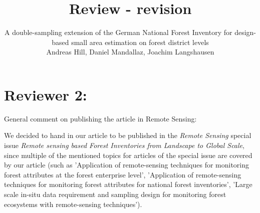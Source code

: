 \documentclass{article}
\title{Review - revision}
\author{A double-sampling extension of the German National Forest Inventory for design-based small area estimation on forest district levels\\
Andreas Hill, Daniel Mandallaz, Joachim Langshausen}
\begin{document}

\maketitle
\thispagestyle{empty}
\newpage

\setcounter{page}{1}

\pagestyle{fancy} %
\fancyfoot[C]{\thepage}
\setlength{\headsep}{15mm}

\newcommand{\answer}[1]{\small \color{mybrown}{#1} \color{black}}
\newcommand{\note}[1]{\textit{\small \color{amaranth} \textbf{Note:} #1} \color{black}}
\newcommand{\todo}[1]{\color{red}{#1} \color{black}}
\newcommand{\answerfin}[1]{\small \color{mygreen}{#1} \color{black}}



\section*{Reviewer 2:}

General comment on publishing the article in Remote Sensing:

We decided to hand in our article to be published in the \textit{Remote Sensing} special issue \textit{Remote sensing based Forest Inventories from Landscape to Global Scale}, since multiple of the mentioned topics for articles of the special issue are covered by our article (such as 'Application of remote-sensing techniques for monitoring forest attributes at the forest enterprise level', 'Application of remote-sensing techniques for monitoring forest attributes for national forest inventories', 'Large scale in-situ data requirement and sampling design for monitoring forest ecosystems with remote-sensing techniques').
\end{document}
